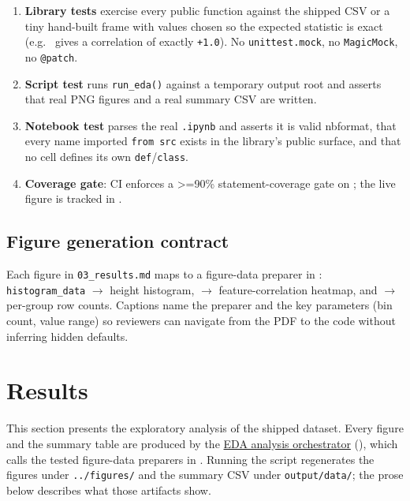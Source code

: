 \documentclass[
  english,
]{article}
\providecommand{\tightlist}{%
  \setlength{\itemsep}{0pt}\setlength{\parskip}{0pt}}
\begin{document}
\begin{enumerate}
\def\labelenumi{\arabic{enumi}.}
\tightlist
\item
  \textbf{Library tests} exercise every public function against the
  shipped CSV or a tiny hand-built frame with values chosen so the
  expected statistic is exact (e.g.~
  gives a correlation of exactly \texttt{+1.0}). No
  \texttt{unittest.mock}, no \texttt{MagicMock}, no \texttt{@patch}.
\item
  \textbf{Script test} runs \texttt{run\_eda()} against a temporary
  output root and asserts that real PNG figures and a real summary CSV
  are written.
\item
  \textbf{Notebook test} parses the real \texttt{.ipynb} and asserts it
  is valid nbformat, that every name imported \texttt{from\ src} exists
  in the library's public surface, and that no cell defines its own
  \texttt{def}/\texttt{class}.
\item
  \textbf{Coverage gate}: CI enforces a \texorpdfstring{\textgreater{}=}{>=}90\% statement-coverage gate on
  ; the live
  figure is tracked in
  \href{../../../../docs/_generated/COUNTS.md}{}.
\end{enumerate}

\subsection{Figure generation
contract}\label{figure-generation-contract}

Each figure in \texttt{03\_results.md} maps to a figure-data preparer in
: \texttt{histogram\_data} \texorpdfstring{\ensuremath{\to}}{->} height
histogram,  \texorpdfstring{\ensuremath{\to}}{->} feature-correlation
heatmap, and  \texorpdfstring{\ensuremath{\to}}{->} per-group row counts.
Captions name the preparer and the key parameters (bin count, value
range) so reviewers can navigate from the PDF to the code without
inferring hidden defaults.

\newpage

\section{Results}\label{sec:results}

This section presents the exploratory analysis of the shipped dataset.
Every figure and the summary table are produced by the
\href{https://github.com/docxology/template/blob/main/projects/templates/template_eda_notebook/scripts/eda_analysis.py}{EDA
analysis orchestrator} (), which calls
the tested figure-data preparers in . Running
the script regenerates the figures under \texttt{../figures/} and the
summary CSV under \texttt{output/data/}; the prose below describes what
those artifacts show.
\end{document}
